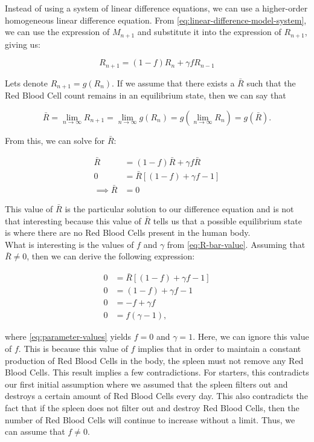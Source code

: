 Instead of using a system of linear difference equations, we can use a higher-order homogeneous linear difference equation. From \eqref{eq:linear-difference-model-system}, we can use the expression of $M_{n+1}$ and substitute it into the expression of $R_{n+1}$, giving us:

\begin{equation}
    R_{n+1} =  (1-f)R_n + \gamma fR_{n-1}
    \label{eq:linear-difference-model-equation}
\end{equation}

Lets denote $R_{n+1} = g(R_n)$.
If we assume that there exists a $\bar{R}$ such that the Red Blood Cell count remains in an equilibrium state, then we can say that

\[
\bar{R} = \lim_{n\to\infty} R_{n+1} = \lim_{n\to\infty} g(R_n) = g\left(\lim_{n\to\infty} R_n\right) = g(\bar{R}).
\]

From this, we can solve for $\bar{R}$:

\begin{align}
    \bar{R} &= (1-f)\bar{R} + \gamma f\bar{R} \nonumber\\
    0 &= \bar{R}[(1-f) + \gamma f - 1] \nonumber \\ 
    \implies \bar{R} &= 0 \label{eq:R-bar-value}
\end{align}

This value of $\bar{R}$ is the particular solution to our difference equation and is not that interesting because this value of $\bar{R}$ tells us that a possible equilibrium state is where there are no Red Blood Cells present in the human body. \\

What is interesting is the values of $f$ and $\gamma$ from \eqref{eq:R-bar-value}. Assuming that $\bar{R} \neq 0$, then we can derive the following expression:

\begin{align} 
    0 &= \bar{R}[(1-f) + \gamma f - 1] \nonumber\\
    0 &= (1-f) + \gamma f - 1 \nonumber\\
    0 &= -f + \gamma f \nonumber\\
    0 &= f(\gamma - 1), \label{eq:parameter-values}
\end{align}

where \eqref{eq:parameter-values} yields $f=0$ and $\gamma=1$. Here, we can ignore this value of $f$. This is because this value of $f$ implies that in order to maintain a constant production of Red Blood Cells in the body, the spleen must not remove any Red Blood Cells. This result implies a few contradictions. For starters, this contradicts our first initial assumption where we assumed that the spleen filters out and destroys a certain amount of Red Blood Cells every day. This also contradicts the fact that if the spleen does not filter out and destroy Red Blood Cells, then the number of Red Blood Cells will continue to increase without a limit. Thus, we can assume that $f\neq0$.\\

